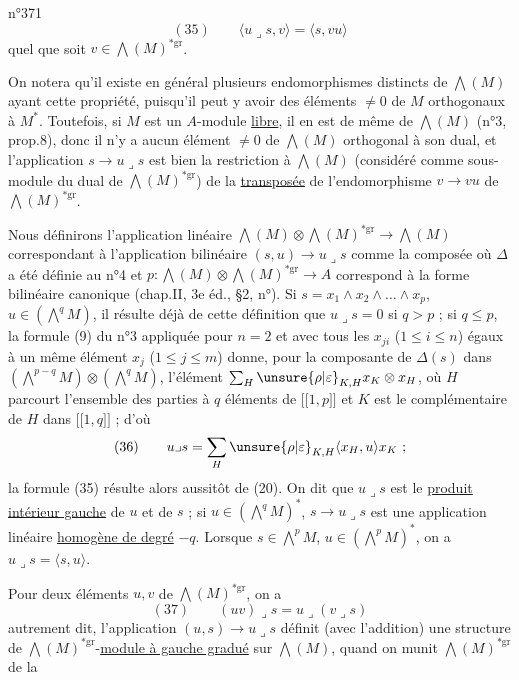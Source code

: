 \hfill n°371
\[
(35)\qquad\langle u\lrcorner s,v\rangle=\langle s,vu\rangle
\]
quel que soit $v\in\bigwedge(M)^{*\mathrm{gr}}$.

On notera qu'il existe en général plusieurs endomorphismes distincts de $\bigwedge(M)$ ayant cette propriété, puisqu'il peut y avoir des éléments $\ne0$ de $M$ orthogonaux à $M^*$. Toutefois, si $M$ est un $A$-module \uline{libre}, il en est de même de $\bigwedge(M)$ (n°3, prop.8), donc il n'y a aucun élément $\ne0$ de $\bigwedge(M)$ orthogonal à son dual, et l'application $s\longrightarrow u\lrcorner s$ est bien la restriction à $\bigwedge(M)$ (considéré comme sous-module du dual de $\bigwedge(M)^{*\mathrm{gr}}$) de la \uline{transposée} de l'endomorphisme $v\longrightarrow vu$ de $\bigwedge(M)^{*\mathrm{gr}}$.

Nous définirons l'application linéaire $\bigwedge(M)\otimes\bigwedge(M)^{*\mathrm{gr}}\longrightarrow\bigwedge(M)$ correspondant à l'application bilinéaire $(s,u)\longrightarrow u\lrcorner s$ comme la composée
où $\Delta$ a été définie au n°4 et $p:\bigwedge(M)\otimes\bigwedge(M)^{*\mathrm{gr}}\longrightarrow A$ correspond à la forme bilinéaire canonique (chap.II, 3e éd., §2, n°\quad). Si $s=x_1\wedge x_2\wedge\ldots\wedge x_p$, $u\in(\bigwedge^qM)$, il résulte déjà de cette définition que $u\lrcorner s=0$ si $q>p$ ; si $q\leq p$, la formule (9) du n°3 appliquée pour $n=2$ et avec tous les $x_{ji}$ ($1\leq i\leq n$) égaux à un même élément $x_j$ ($1\leq j\leq m$) donne, pour la composante de $\Delta(s)$ dans $(\bigwedge^{p-q}M)\otimes(\bigwedge^qM)$, l'élément $\sum_H\unsure{\rho|\varepsilon}_{K,H}x_K\otimes x_H$, où $H$ parcourt l'ensemble des parties à $q$ éléments de $\lbrack\!\lbrack1,p\rbrack\!\rbrack$ et $K$ est le complémentaire de $H$ dans $\lbrack\!\lbrack1,q\rbrack\!\rbrack$ ; d'où
\[
(36)\qquad u\lrcorner s=\sum_H\unsure{\rho|\varepsilon}_{K,H}\langle x_H,u\rangle x_K\ ;
\]
la formule (35) résulte alors aussitôt de (20). On dit que $u\lrcorner s$ est le \uline{produit intérieur gauche} de $u$ et de $s$ ; si $u\in(\bigwedge^qM)^*$, $s\longrightarrow u\lrcorner s$ est une application linéaire \uline{homogène de degré} $-q$. Lorsque $s\in\bigwedge^pM$, $u\in(\bigwedge^pM)^*$, on a $u\lrcorner s=\langle s,u\rangle$.

Pour deux éléments $u,v$ de $\bigwedge(M)^{*\mathrm{gr}}$, on a
\[
(37)\qquad(uv)\lrcorner s=u\lrcorner(v\lrcorner s)
\]
autrement dit, l'application $(u,s)\longrightarrow u\lrcorner s$ définit (avec l'addition) une structure de $\bigwedge(M)^{*\mathrm{gr}}$-\uline{module à gauche gradué} sur $\bigwedge(M)$, quand on munit $\bigwedge(M)^{*\mathrm{gr}}$ de la
